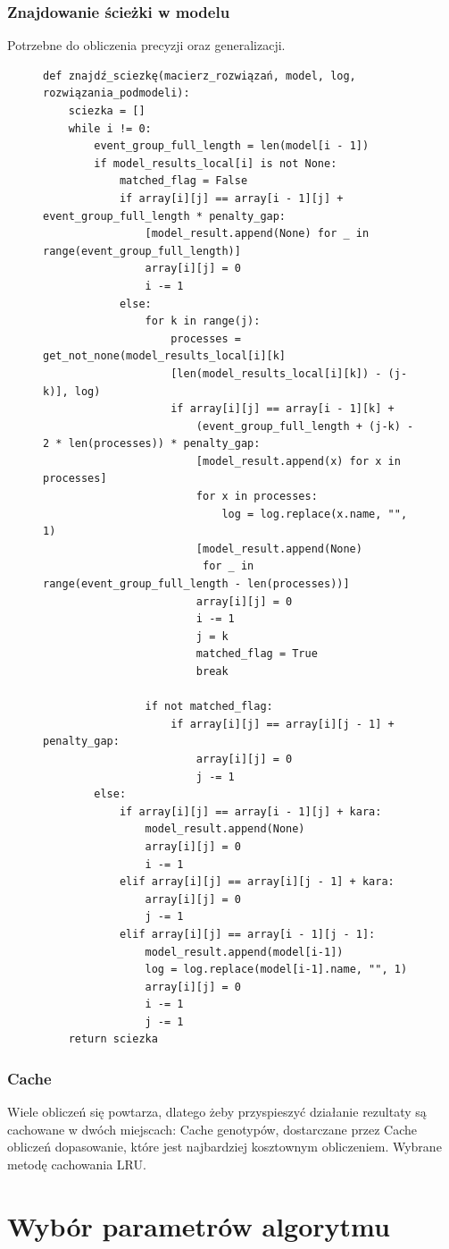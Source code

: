 \subsubsection{Znajdowanie ścieżki w modelu}
Potrzebne do obliczenia precyzji oraz generalizacji.
\begin{figure}[!ht]
\lstset{caption=Znajdowanie ścieżki w modelu, captionpos=b}
\lstset{label=src:traceback, frame=single}
\begin{lstlisting}
def znajdź_sciezkę(macierz_rozwiązań, model, log, rozwiązania_podmodeli):
    sciezka = []
    while i != 0:
        event_group_full_length = len(model[i - 1])
        if model_results_local[i] is not None:
            matched_flag = False
            if array[i][j] == array[i - 1][j] + event_group_full_length * penalty_gap:
                [model_result.append(None) for _ in range(event_group_full_length)]
                array[i][j] = 0
                i -= 1
            else:
                for k in range(j):
                    processes = get_not_none(model_results_local[i][k]
                    [len(model_results_local[i][k]) - (j-k)], log)
                    if array[i][j] == array[i - 1][k] + 
                    	(event_group_full_length + (j-k) - 2 * len(processes)) * penalty_gap:
                        [model_result.append(x) for x in processes]
                        for x in processes:
                            log = log.replace(x.name, "", 1)
                        [model_result.append(None) 
                         for _ in range(event_group_full_length - len(processes))]
                        array[i][j] = 0
                        i -= 1
                        j = k
                        matched_flag = True
                        break

                if not matched_flag:
                    if array[i][j] == array[i][j - 1] + penalty_gap:
                        array[i][j] = 0
                        j -= 1
        else:
            if array[i][j] == array[i - 1][j] + kara:
                model_result.append(None)
                array[i][j] = 0
                i -= 1
            elif array[i][j] == array[i][j - 1] + kara:
                array[i][j] = 0
                j -= 1
            elif array[i][j] == array[i - 1][j - 1]:
                model_result.append(model[i-1])
                log = log.replace(model[i-1].name, "", 1)
                array[i][j] = 0
                i -= 1
                j -= 1
    return sciezka
\end{lstlisting}
\end{figure}

\subsubsection{Cache}

Wiele obliczeń się powtarza, dlatego żeby przyspieszyć działanie rezultaty są cachowane w dwóch miejscach:
Cache genotypów, dostarczane przez 
Cache obliczeń dopasowanie, które jest najbardziej kosztownym obliczeniem. Wybrane metodę cachowania LRU.  
\section{Wybór parametrów algorytmu}

